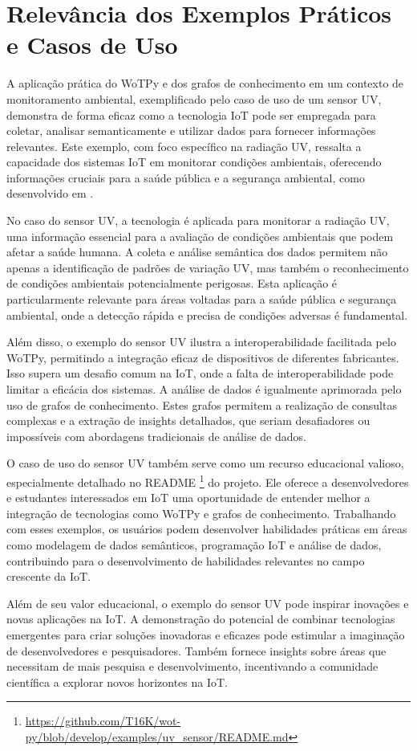 \section{Relevância dos Exemplos Práticos e Casos de Uso}

A aplicação prática do WoTPy e dos grafos de conhecimento em um contexto de monitoramento ambiental, exemplificado pelo caso de uso de um sensor UV, demonstra de forma eficaz como a tecnologia IoT pode ser empregada para coletar, analisar semanticamente e utilizar dados para fornecer informações relevantes. Este exemplo, com foco específico na radiação UV, ressalta a capacidade dos sistemas IoT em monitorar condições ambientais, oferecendo informações cruciais para a saúde pública e a segurança ambiental, como desenvolvido em \cite{Ariga2023}.

No caso do sensor UV, a tecnologia é aplicada para monitorar a radiação UV, uma informação essencial para a avaliação de condições ambientais que podem afetar a saúde humana. A coleta e análise semântica dos dados permitem não apenas a identificação de padrões de variação UV, mas também o reconhecimento de condições ambientais potencialmente perigosas. Esta aplicação é particularmente relevante para áreas voltadas para a saúde pública e segurança ambiental, onde a detecção rápida e precisa de condições adversas é fundamental.

Além disso, o exemplo do sensor UV ilustra a interoperabilidade facilitada pelo WoTPy, permitindo a integração eficaz de dispositivos de diferentes fabricantes. Isso supera um desafio comum na IoT, onde a falta de interoperabilidade pode limitar a eficácia dos sistemas. A análise de dados é igualmente aprimorada pelo uso de grafos de conhecimento. Estes grafos permitem a realização de consultas complexas e a extração de insights detalhados, que seriam desafiadores ou impossíveis com abordagens tradicionais de análise de dados.

O caso de uso do sensor UV também serve como um recurso educacional valioso, especialmente detalhado no README \footnote{\url{https://github.com/T16K/wot-py/blob/develop/examples/uv_sensor/README.md}} do projeto. Ele oferece a desenvolvedores e estudantes interessados em IoT uma oportunidade de entender melhor a integração de tecnologias como WoTPy e grafos de conhecimento. Trabalhando com esses exemplos, os usuários podem desenvolver habilidades práticas em áreas como modelagem de dados semânticos, programação IoT e análise de dados, contribuindo para o desenvolvimento de habilidades relevantes no campo crescente da IoT.

Além de seu valor educacional, o exemplo do sensor UV pode inspirar inovações e novas aplicações na IoT. A demonstração do potencial de combinar tecnologias emergentes para criar soluções inovadoras e eficazes pode estimular a imaginação de desenvolvedores e pesquisadores. Também fornece insights sobre áreas que necessitam de mais pesquisa e desenvolvimento, incentivando a comunidade científica a explorar novos horizontes na IoT.
